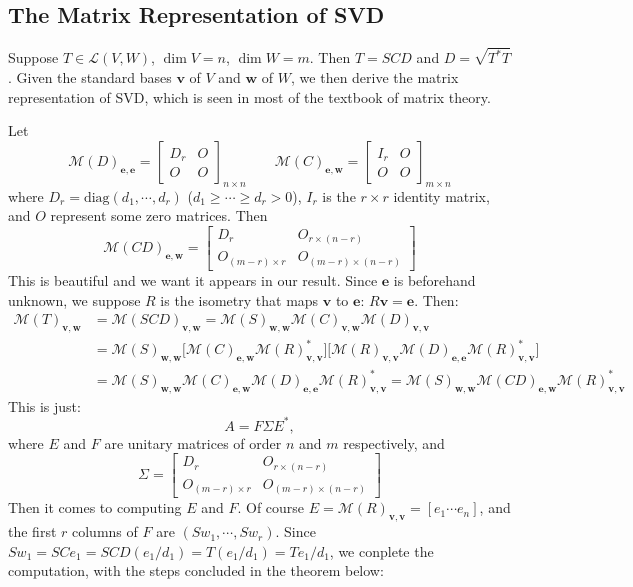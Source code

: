 \documentclass{article}
\begin{document}
\subsection{The Matrix Representation of SVD}
Suppose $T\in\mathcal{L}(V, W)$, $\dim V = n$, $\dim W = m$. Then $T = SCD$ and $D = \sqrt{T^\ast T}$. Given the standard bases $\pmb{v}$ of $V$ and $\pmb{w}$ of $W$, we then derive the matrix representation of SVD, which is seen in most of the textbook of matrix theory.

Let 
$$ \mathcal{M}(D)_{\pmb{e},\pmb{e}} = 
\begin{bmatrix}
    D_r & O \\
    O & O
\end{bmatrix}_{n\times n} \qquad \mathcal{M}(C)_{\pmb{e},\pmb{w}} = 
\begin{bmatrix}
    I_r & O \\
    O & O
\end{bmatrix}_{m\times n} $$
where $D_r = \text{diag}(d_1,\cdots,d_r)$ ($d_1\geq\cdots\geq d_r>0$), $I_r$ is the $r\times r$ identity matrix, and $O$ represent some zero matrices. Then 
$$ \mathcal{M}(CD)_{\pmb{e,w}} = 
\begin{bmatrix}
    D_r & O_{r\times (n-r)} \\
    O_{(m-r)\times r} & O_{(m-r)\times (n-r)} 
\end{bmatrix}
$$ 
This is beautiful and we want it appears in our result. Since $\pmb{e}$ is beforehand unknown, we suppose $R$ is the isometry that maps $\pmb{v}$ to $\pmb{e}$: $R\pmb{v} = \pmb{e}$. Then:
$$ \begin{aligned}
    \mathcal{M}(T)_{\pmb{v,w}} &= \mathcal{M}(SCD)_{\pmb{v,w}} = \mathcal{M}(S)_{\pmb{w,w}}\mathcal{M}(C)_{\pmb{v,w}}\mathcal{M}(D)_{\pmb{v,v}} \\
    &=\mathcal{M}(S)_{\pmb{w,w}}\Big[\mathcal{M}(C)_{\pmb{e,w}}\mathcal{M}(R)^\ast_{\pmb{v,v}}\Big] \Big[\mathcal{M}(R)_{\pmb{v,v}}\mathcal{M}(D)_{\pmb{e,e}}\mathcal{M}(R)_{\pmb{v,v}}^\ast\Big] \\
    &= \mathcal{M}(S)_{\pmb{w,w}}\mathcal{M}(C)_{\pmb{e,w}}\mathcal{M}(D)_{\pmb{e,e}}\mathcal{M}(R)^{\ast}_{\pmb{v,v}} = \mathcal{M}(S)_{\pmb{w,w}}\mathcal{M}(CD)_{\pmb{e,w}}\mathcal{M}(R)^{\ast}_{\pmb{v,v}}
\end{aligned}
$$
This is just:
$$ A = F\Sigma E^\ast, $$
where $E$ and $F$ are unitary matrices of order $n$ and $m$ respectively, and 
$$ \Sigma = 
\begin{bmatrix}
    D_r & O_{r\times (n-r)} \\
    O_{(m-r)\times r} & O_{(m-r)\times (n-r)} 
\end{bmatrix} $$
Then it comes to computing $E$ and $F$. Of course $E = \mathcal{M}(R)_{\pmb{v,v}} = [e_1\cdots e_n]$, and the first $r$ columns of $F$ are $(Sw_1,\cdots,Sw_r)$. Since $Sw_1 = SCe_1 = SCD(e_1/d_1) = T(e_1/d_1) = Te_1/d_1$, we conplete the computation, with the steps concluded in the theorem below:
\end{document}
